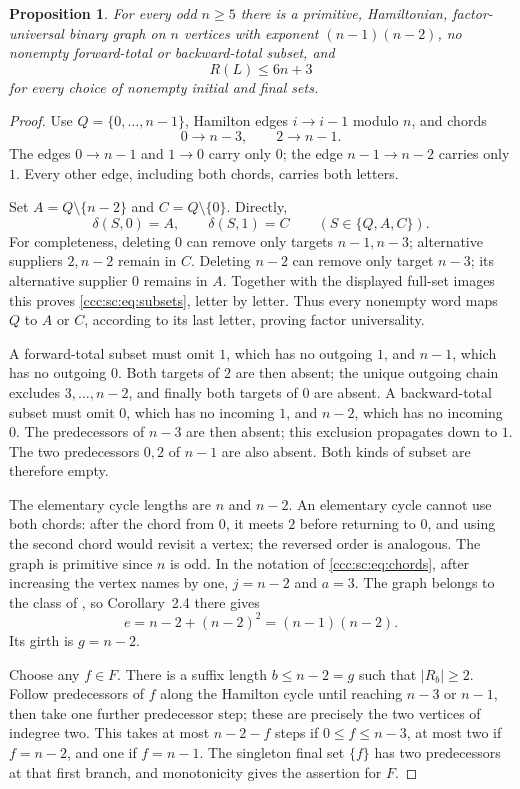 \documentclass[11pt,letterpaper]{article}
\newtheorem{proposition}[theorem]{Proposition}
\theoremstyle{definition}
\theoremstyle{remark}
\begin{document}
\begin{proposition}\label{ccc:sc:prop:barrier}
For every odd $n\ge5$ there is a primitive, Hamiltonian, factor-universal binary graph on $n$ vertices with exponent $(n-1)(n-2)$, no nonempty forward-total or backward-total subset, and
\[
 R(L)\le6n+3
\]
for every choice of nonempty initial and final sets.
\end{proposition}
\begin{proof}
Use $Q=\{0,\ldots,n-1\}$, Hamilton edges $i\to i-1$ modulo $n$, and chords
\[
 0\to n-3,\qquad 2\to n-1.
\]
The edges $0\to n-1$ and $1\to0$ carry only $0$; the edge $n-1\to n-2$ carries only $1$. Every other edge, including both chords, carries both letters.

Set $A=Q\setminus\{n-2\}$ and $C=Q\setminus\{0\}$. Directly,
\begin{equation}\label{ccc:sc:eq:subsets}
 \delta(S,0)=A,\qquad\delta(S,1)=C\qquad(S\in\{Q,A,C\}).
\end{equation}
For completeness, deleting $0$ can remove only targets $n-1,n-3$; alternative suppliers $2,n-2$ remain in $C$. Deleting $n-2$ can remove only target $n-3$; its alternative supplier $0$ remains in $A$. Together with the displayed full-set images this proves \eqref{ccc:sc:eq:subsets}, letter by letter. Thus every nonempty word maps $Q$ to $A$ or $C$, according to its last letter, proving factor universality.

A forward-total subset must omit $1$, which has no outgoing $1$, and $n-1$, which has no outgoing $0$. Both targets of $2$ are then absent; the unique outgoing chain excludes $3,\ldots,n-2$, and finally both targets of $0$ are absent. A backward-total subset must omit $0$, which has no incoming $1$, and $n-2$, which has no incoming $0$. The predecessors of $n-3$ are then absent; this exclusion propagates down to $1$. The two predecessors $0,2$ of $n-1$ are also absent. Both kinds of subset are therefore empty.

The elementary cycle lengths are $n$ and $n-2$. An elementary cycle cannot use both chords: after the chord from $0$, it meets $2$ before returning to $0$, and using the second chord would revisit a vertex; the reversed order is analogous. The graph is primitive since $n$ is odd. In the notation of \eqref{ccc:sc:eq:chords}, after increasing the vertex names by one, $j=n-2$ and $a=3$. The graph belongs to the class of \cite[Theorem~2.2]{KOV}, so Corollary~2.4 there gives
\[
 e=n-2+(n-2)^2=(n-1)(n-2).
\]
Its girth is $g=n-2$.

Choose any $f\in F$. There is a suffix length $b\le n-2=g$ such that $|R_b|\ge2$. Follow predecessors of $f$ along the Hamilton cycle until reaching $n-3$ or $n-1$, then take one further predecessor step; these are precisely the two vertices of indegree two. This takes at most $n-2-f$ steps if $0\le f\le n-3$, at most two if $f=n-2$, and one if $f=n-1$. The singleton final set $\{f\}$ has two predecessors at that first branch, and monotonicity gives the assertion for $F$.


\end{proof}
\end{document}
